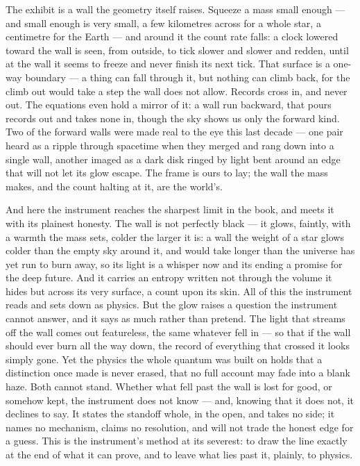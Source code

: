 The exhibit is a wall the geometry itself raises. Squeeze a mass small enough --- and small enough is very
small, a few kilometres across for a whole star, a centimetre for the Earth --- and around it the count rate
falls: a clock lowered toward the wall is seen, from outside, to tick slower and slower and redden, until at the
wall it seems to freeze and never finish its next tick. That surface is a one-way boundary --- a thing can fall
through it, but nothing can climb back, for the climb out would take a step the wall does not allow. Records
cross in, and never out. The equations even hold a mirror of it: a wall run backward, that pours records out and
takes none in, though the sky shows us only the forward kind. Two of the forward walls were made real to the eye
this last decade --- one pair heard as a ripple through spacetime when they merged and rang down into a single
wall, another imaged as a dark disk ringed by light bent around an edge that will not let its glow escape. The
frame is ours to lay; the wall the mass makes, and the count halting at it, are the world's.

And here the instrument reaches the sharpest limit in the book, and meets it with its plainest honesty. The
wall is not perfectly black --- it glows, faintly, with a warmth the mass sets, colder the larger it is: a wall
the weight of a star glows colder than the empty sky around it, and would take longer than the universe has yet
run to burn away, so its light is a whisper now and its ending a promise for the deep future. And it carries an
entropy written not through the volume it hides but across its very surface, a count upon its skin. All of this the instrument reads and sets down as physics. But the glow raises a question the instrument
cannot answer, and it says as much rather than pretend. The light that streams off the wall comes out
featureless, the same whatever fell in --- so that if the wall should ever burn all the way down, the record of
everything that crossed it looks simply gone. Yet the physics the whole quantum was built on holds that a
distinction once made is never erased, that no full account may fade into a blank haze. Both cannot stand.
Whether what fell past the wall is lost for good, or somehow kept, the instrument
does not know --- and, knowing that it does not, it declines to say. It states the standoff whole, in the open,
and takes no side; it names no mechanism, claims no resolution, and will not trade the honest edge for a guess.
This is the instrument's method at its severest: to draw the line exactly at the end of what it can prove, and
to leave what lies past it, plainly, to physics.

